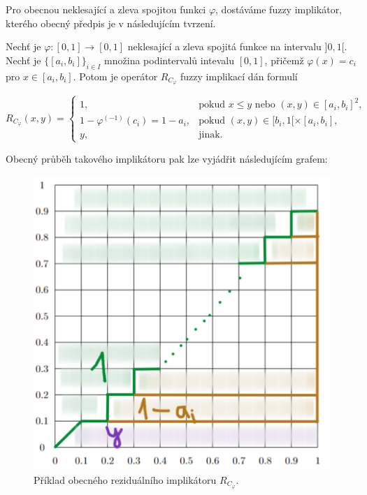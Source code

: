 Pro obecnou neklesající a zleva spojitou funkci $\varphi$,  dostáváme fuzzy implikátor, kterého obecný předpis je v následujícím tvrzení.
\begin{sentence}
\cite{mitav}
\label{r-impl}
     Nechť je $\varphi:[0,1]\rightarrow [0,1]$
neklesající a zleva spojitá funkce na intervalu $]0,1[$.
Nechť je
$\{[a_i,b_i]\}_{i\in I}$ množina podintervalů intevalu $[0,1]$, přičemž $\varphi(x)=c_i$ pro $x\in
[a_i,b_i]$.
Potom je operátor $R_{C_\varphi}$ fuzzy implikací dán formulí

$$ R_{C_\varphi}(x,y) = \begin{cases} 1, & \mbox{pokud } x\leq y \mbox{ nebo } (x,y) \in [a_i,b_i]^2,\\
1-\varphi^{(-1)}(c_i)=1-a_i, &\mbox {pokud }
(x,y)\in [b_i,1[\times[a_i,b_i],
\\ y, &\mbox {jinak.}
\end{cases} $$
\end{sentence}

Obecný průběh takového implikátoru pak lze vyjádřit následujícím grafem:

\begin{figure}[H]
\caption{Příklad obecného reziduálního implikátoru $R_{C_\varphi}$.}
            \hspace{-1cm}
            \includegraphics[scale=0.5]{template-fig/r-impliphi.pdf}
            \centering
\end{figure}


